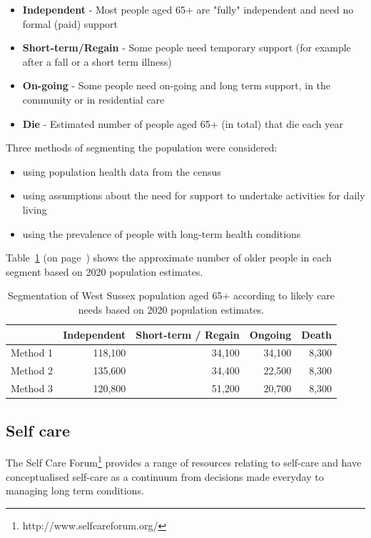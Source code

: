 \begin{itemize}[noitemsep]
    \item {\bf Independent} - Most people aged 65+ are "fully" independent and need no formal (paid) support
    \item {\bf Short-term/Regain} - Some people need temporary support (for example after a fall or a short term illness)
    \item {\bf On-going} - Some people need on-going and long term support, in the community or in residential care
    \item {\bf Die} - Estimated number of people aged 65+ (in total) that die each year
\end{itemize}

Three methods of segmenting the population were considered:

\begin{itemize}[noitemsep]
    \item using population health data from the census
    \item using  assumptions about the need for support to undertake activities for daily living
    \item using the prevalence of people with long-term health conditions
\end{itemize}

Table~\ref{tab:care_segments} (on page~\pageref{tab:care_segments}) shows the approximate number of older people in each segment based on 2020 population estimates.

\begin{table}[H]
    \caption{Segmentation of West Sussex population aged 65+ according to likely care needs based on 2020 population estimates.}
    \centering
    \begin{tabular}{lrrrr}
        \toprule
        \ & Independent & Short-term / Regain & Ongoing & Death \\
        \midrule
        Method 1 & 118,100 & 34,100 & 34,100 & 8,300\\
        Method 2 & 135,600 & 34,400 & 22,500 & 8,300\\
        Method 3 & 120,800 & 51,200 & 20,700 & 8,300\\
        \bottomrule
    \end{tabular}
    \label{tab:care_segments}
\end{table}

\subsection{Self care} 
The Self Care Forum\footnote{http://www.selfcareforum.org/} provides a range of resources relating to self-care and have conceptualised self-care as a continuum from decisions made everyday to managing long term conditions.

